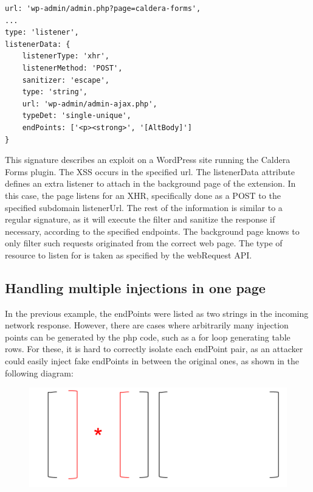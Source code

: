  \lstset{basicstyle=\small}
\begin{lstlisting}
url: 'wp-admin/admin.php?page=caldera-forms',
...
type: 'listener',
listenerData: {
	listenerType: 'xhr',
	listenerMethod: 'POST',
	sanitizer: 'escape',
	type: 'string',
	url: 'wp-admin/admin-ajax.php',
	typeDet: 'single-unique',
	endPoints: ['<p><strong>', '[AltBody]']
}
\end{lstlisting}

This signature describes an exploit on a WordPress site running the Caldera Forms plugin. The XSS occurs in the specified url. The listenerData attribute defines an extra listener to attach in the background page of the extension. In this case, the page listens for an XHR, specifically done as a POST to the specified subdomain listenerUrl. The rest of the information is similar to a regular signature, as it will execute the filter and sanitize the response if necessary, according to the specified endpoints. The background page knows to only filter such requests originated from the correct web page. The type of resource to listen for is taken as specified by the webRequest API. 

\subsection{Handling multiple injections in one page}
In the previous example, the endPoints were listed as two strings in the incoming network response. However, there are cases where arbitrarily many injection points can be generated by the php code, such as a for loop generating table rows. For these, it is hard to correctly isolate each endPoint pair, as an attacker could easily inject fake endPoints in between the original ones, as shown in the following diagram:

\begin{figure}[h]
	\includegraphics[scale=0.5]{img/attacker_injection.png}
	\label{fig:attacker_injection}
\end{figure}

